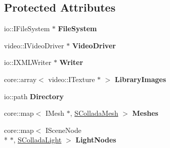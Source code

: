 \subsection*{Protected Attributes}
\begin{DoxyCompactItemize}
\item 
\hypertarget{classirr_1_1scene_1_1_c_collada_mesh_writer_a3042e83ebc15c43729e79c6b79e7ed61}{io\-::\-I\-File\-System $\ast$ {\bfseries File\-System}}\label{classirr_1_1scene_1_1_c_collada_mesh_writer_a3042e83ebc15c43729e79c6b79e7ed61}

\item 
\hypertarget{classirr_1_1scene_1_1_c_collada_mesh_writer_a828acbaa2a22ee4c5bd35061cc9f89a5}{video\-::\-I\-Video\-Driver $\ast$ {\bfseries Video\-Driver}}\label{classirr_1_1scene_1_1_c_collada_mesh_writer_a828acbaa2a22ee4c5bd35061cc9f89a5}

\item 
\hypertarget{classirr_1_1scene_1_1_c_collada_mesh_writer_a75b014ef303cfe069439a1f62dcfe2f5}{io\-::\-I\-X\-M\-L\-Writer $\ast$ {\bfseries Writer}}\label{classirr_1_1scene_1_1_c_collada_mesh_writer_a75b014ef303cfe069439a1f62dcfe2f5}

\item 
\hypertarget{classirr_1_1scene_1_1_c_collada_mesh_writer_ac4414c27d9265f9a5a19c7376771fda4}{core\-::array$<$ video\-::\-I\-Texture $\ast$ $>$ {\bfseries Library\-Images}}\label{classirr_1_1scene_1_1_c_collada_mesh_writer_ac4414c27d9265f9a5a19c7376771fda4}

\item 
\hypertarget{classirr_1_1scene_1_1_c_collada_mesh_writer_a33442bb1d157bb98c1d934e775e56194}{io\-::path {\bfseries Directory}}\label{classirr_1_1scene_1_1_c_collada_mesh_writer_a33442bb1d157bb98c1d934e775e56194}

\item 
\hypertarget{classirr_1_1scene_1_1_c_collada_mesh_writer_ad302accb190a7bf1b7605733da10b023}{core\-::map$<$ I\-Mesh $\ast$, \hyperlink{structirr_1_1scene_1_1_c_collada_mesh_writer_1_1_s_collada_mesh}{S\-Collada\-Mesh} $>$ {\bfseries Meshes}}\label{classirr_1_1scene_1_1_c_collada_mesh_writer_ad302accb190a7bf1b7605733da10b023}

\item 
\hypertarget{classirr_1_1scene_1_1_c_collada_mesh_writer_a07123aa1d73b2f9c7aa34c895133e934}{core\-::map$<$ I\-Scene\-Node \\*
$\ast$, \hyperlink{structirr_1_1scene_1_1_c_collada_mesh_writer_1_1_s_collada_light}{S\-Collada\-Light} $>$ {\bfseries Light\-Nodes}}\label{classirr_1_1scene_1_1_c_collada_mesh_writer_a07123aa1d73b2f9c7aa34c895133e934}


\end{DoxyCompactItemize}
